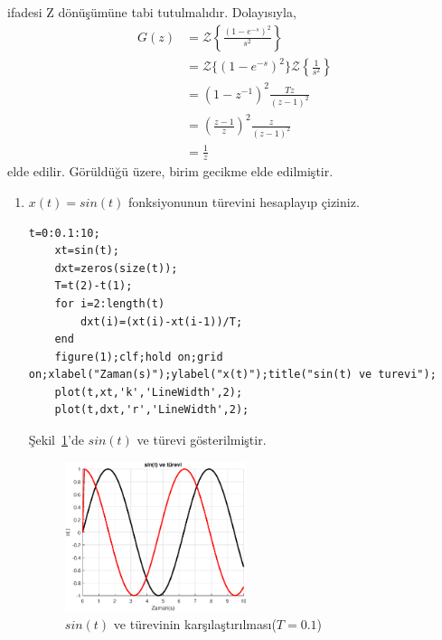 ifadesi Z dönüşümüne tabi tutulmalıdır. Dolayısıyla,
\begin{equation}
    \begin{split}
        G(z)&=\mathcal{Z}\left\{\frac{(1-e^{-s})^2}{s^2}\right\}\\
        &=\mathcal{Z}\{(1-e^{-s})^2\}\mathcal{Z}\left\{\frac{1}{s^2}\right\}\\
        &=\left(1-z^{-1}\right)^2\frac{Tz}{(z-1)^2}\\
        &=\left(\frac{z-1}{z}\right)^2\frac{z}{(z-1)^2}\\
        &=\frac{1}{z}
    \end{split}\label{eqn:ornek_sistem_foh}
\end{equation}
elde edilir. Görüldüğü üzere, birim gecikme elde edilmiştir.

\begin{enumerate}
    \item $x(t)=sin(t)$ fonksiyonunun türevini hesaplayıp çiziniz.
    \begin{lstlisting}[style=Matlab-editor]
    t=0:0.1:10;
    xt=sin(t);
    dxt=zeros(size(t));
    T=t(2)-t(1);
    for i=2:length(t)
        dxt(i)=(xt(i)-xt(i-1))/T;
    end
    figure(1);clf;hold on;grid on;xlabel("Zaman(s)");ylabel("x(t)");title("sin(t) ve turevi");
    plot(t,xt,'k','LineWidth',2);
    plot(t,dxt,'r','LineWidth',2);
    \end{lstlisting}
    Şekil~\ref{fig:lec2_plot1}'de $sin(t)$ ve türevi gösterilmiştir.
    \begin{figure}[!htb]
        \centering
        \includegraphics[width=0.5\textwidth]{img/lec2_plot1}
        \caption{$sin(t)$ ve türevinin karşılaştırılması($T=0.1$)}
        \label{fig:lec2_plot1}
    \end{figure}


\end{enumerate}
